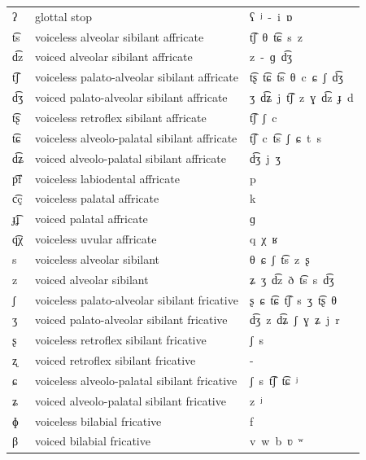 \begin{center}
\begin{tabular}{lll}
ʔ & glottal stop & ʕ\ ʲ\ -\ \color{gray}i\ ɒ\\
t͡s & voiceless alveolar sibilant affricate & t͡ʃ\ θ\ t͡ɕ\ s\ \color{gray}z\\
d͡z & voiced alveolar sibilant affricate & z\ -\ \color{gray}ɡ\ d͡ʒ\\
t͡ʃ & voiceless palato-alveolar sibilant affricate & t͡ʂ\ t͡ɕ\ t͡s\ θ\ c\ ɕ\ ʃ\ d͡ʒ\\
d͡ʒ & voiced palato-alveolar sibilant affricate & ʒ\ d͡ʑ\ j\ t͡ʃ\ z\ ɣ\ \color{gray}d͡z\ ɟ\ d\\
t͡ʂ & voiceless retroflex sibilant affricate & t͡ʃ\ ʃ\ \color{gray}c\\
t͡ɕ & voiceless alveolo-palatal sibilant affricate & t͡ʃ\ c\ t͡s\ ʃ\ ɕ\ \color{gray}t\ s\\
d͡ʑ & voiced alveolo-palatal sibilant affricate & d͡ʒ\ j\ ʒ\\
p͡f & voiceless labiodental affricate & p\\
c͡ç & voiceless palatal affricate & k\\
ɟ͡ʝ & voiced palatal affricate & ɡ\\
q͡χ & voiceless uvular affricate & q\ χ\ \color{gray}ʁ\\
s & voiceless alveolar sibilant & θ\ ɕ\ ʃ\ t͡s\ z\ \color{gray}ʂ\\
z & voiced alveolar sibilant & ʑ\ ʒ\ d͡z\ ð\ t͡s\ \color{gray}s\ d͡ʒ\\
ʃ & voiceless palato-alveolar sibilant fricative & ʂ\ ɕ\ t͡ɕ\ t͡ʃ\ s\ ʒ\ t͡ʂ\ \color{gray}θ\\
ʒ & voiced palato-alveolar sibilant fricative & d͡ʒ\ z\ d͡ʑ\ ʃ\ \color{gray}ɣ\ ʑ\ j\ r\\
ʂ & voiceless retroflex sibilant fricative & ʃ\ \color{gray}s\\
ʐ & voiced retroflex sibilant fricative & -\\
ɕ & voiceless alveolo-palatal sibilant fricative & ʃ\ s\ t͡ʃ\ t͡ɕ\ ʲ\\
ʑ & voiced alveolo-palatal sibilant fricative & z\ \color{gray}ʲ\\
ɸ & voiceless bilabial fricative & f\\
β & voiced bilabial fricative & v\ w\ b\ ʋ\ \color{gray}ʷ\\
\hline
\end{tabular}
%
\addtocounter{figure}{-1}
\end{center}

